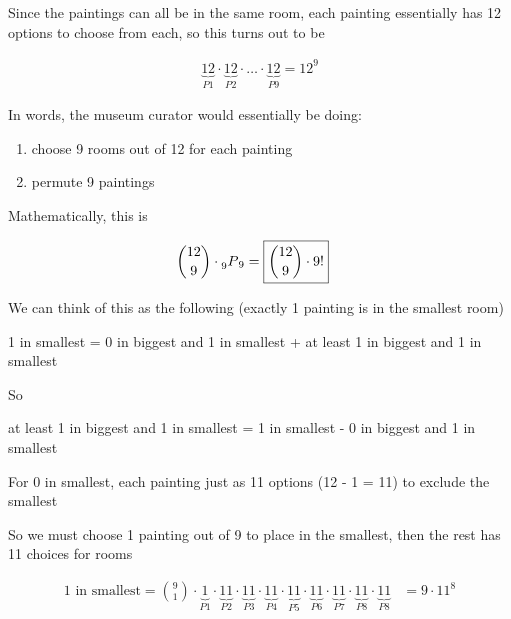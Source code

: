 \documentclass[../Main.tex]{subfiles}
\begin{document}
\begin{alphabet}
    
    \item
    {
        Since the paintings can all be in the same room, each painting essentially has 12 options to choose from each, so this turns out to be

        \begin{align}
            \underbrace{12}_{P1} \cdot \underbrace{12}_{P2} \cdot \ldots \cdot \underbrace{12}_{P9} = \boxed{12^9}
        \end{align}
    }

    \item 
    {
        In words, the museum curator would essentially be doing:

        \begin{enumerate}
            \item choose 9 rooms out of 12 for each painting
            \item permute 9 paintings
        \end{enumerate}

        Mathematically, this is

        \begin{align*}
            {12 \choose 9} \cdot \prescript{}{9}{P}_9 &= \boxed{{12 \choose 9} \cdot 9!}
        \end{align*}
    }

    \item
    {
        We can think of this as the following (exactly 1 painting is in the smallest room)

        \begin{center}
            1 in smallest = 0 in biggest and 1 in smallest + at least 1 in biggest and 1 in smallest
        \end{center}

        So

        \begin{center}
            at least 1 in biggest and 1 in smallest = 1 in smallest - 0 in biggest and 1 in smallest
        \end{center}

        For 0 in smallest, each painting just as 11 options (12 - 1 = 11) to exclude the smallest

        So we must choose 1 painting out of 9 to place in the smallest, then the rest has 11 choices for rooms

        \begin{align*}
            \text{1 in smallest} = {9 \choose 1} \cdot \underbrace{1}_{P1} \cdot \underbrace{11}_{P2} \cdot \underbrace{11}_{P3} \cdot \underbrace{11}_{P4} \cdot \underbrace{11}_{P5} \cdot \underbrace{11}_{P6} \cdot \underbrace{11}_{P7} \cdot \underbrace{11}_{P8} \cdot \underbrace{11}_{P8} &= 9 \cdot 11^8
        \end{align*}

}
\end{alphabet}
\end{document}
